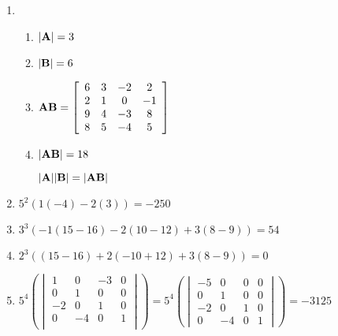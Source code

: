 \documentclass[12pt]{article}
\begin{document}
\begin{enumerate}
\begin{enumerate}
    \end{enumerate}

    \setcounter{enumi}{4}

  \item

    \begin{enumerate}

      \item $|\bold{A}|=3$

      \item $|\bold{B}|=6$

      \item $\bold{AB}=\left[ \begin{array}{cccc} 6 & 3 & -2 & 2\\ 2 & 1 & 0 & -1\\ 9 & 4 & -3 & 8\\ 8 & 5 & -4 & 5  \end{array} \right]$

      \item $|\bold{AB}|=18$

        \begin{center}
          $|\bold{A}||\bold{B}|=|\bold{AB}|$ \checkmark 
        \end{center}

    \end{enumerate}

    \setcounter{enumi}{6}

  \item $5^2\left( 1(-4)-2(3) \right)=-250$

    \setcounter{enumi}{8}

  \item $3^3\left( -1(15-16)-2(10-12)+3(8-9) \right)=54$

    \setcounter{enumi}{10}

  \item $2^3\left( (15-16)+2(-10+12)+3(8-9) \right)=0$

    \setcounter{enumi}{12}

  \item $5^4\left(\begin{vmatrix} 1 & 0 & -3 & 0\\ 0 & 1 & 0 & 0\\ -2 & 0 & 1 & 0\\ 0 & -4 & 0 & 1\\  \end{vmatrix}\right)=5^4\left( \begin{vmatrix} -5 & 0 & 0 & 0\\ 0 & 1 & 0 & 0\\ -2 & 0 & 1 & 0 \\ 0 & -4 & 0 & 1  \end{vmatrix} \right)=-3125$


\end{enumerate}
\end{document}
